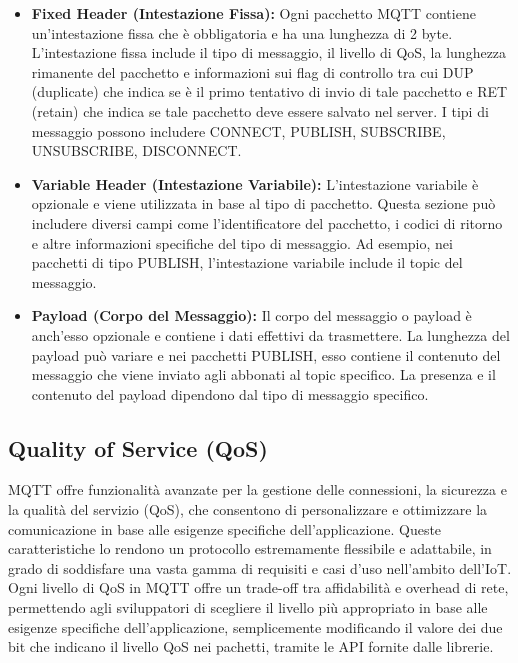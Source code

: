 \documentclass[12pt,a4paper,openright,twoside]{book}
\begin{document}
\begin{itemize}
\item \textbf{Fixed Header (Intestazione Fissa):} Ogni pacchetto MQTT contiene un'intestazione fissa che è obbligatoria e ha una lunghezza di 2 byte. 
L'intestazione fissa include il tipo di messaggio, il livello di \ac{QoS}, la lunghezza rimanente del pacchetto e informazioni sui flag di controllo
tra cui DUP (duplicate) che indica se è il primo tentativo di invio di tale pacchetto e RET (retain) che indica se tale pacchetto deve essere salvato nel server.
I tipi di messaggio possono includere CONNECT, PUBLISH, SUBSCRIBE, UNSUBSCRIBE, DISCONNECT.
\item \textbf{Variable Header (Intestazione Variabile):} L'intestazione variabile è opzionale e viene utilizzata in base al tipo di pacchetto. 
Questa sezione può includere diversi campi come l'identificatore del pacchetto, i codici di ritorno e altre informazioni specifiche del tipo di messaggio. 
Ad esempio, nei pacchetti di tipo PUBLISH, l'intestazione variabile include il topic del messaggio.
\item \textbf{Payload (Corpo del Messaggio):} Il corpo del messaggio o payload è anch'esso opzionale e contiene i dati effettivi da trasmettere. 
La lunghezza del payload può variare e nei pacchetti PUBLISH, esso contiene il contenuto del messaggio che viene inviato agli abbonati al topic specifico. 
La presenza e il contenuto del payload dipendono dal tipo di messaggio specifico.
\end{itemize}

\subsection{Quality of Service (QoS)}

\ac{MQTT} offre funzionalità avanzate per la gestione delle connessioni, la sicurezza e la qualità del servizio (\ac{QoS}), che consentono di personalizzare e ottimizzare 
la comunicazione in base alle esigenze specifiche dell'applicazione. Queste caratteristiche lo rendono un protocollo estremamente flessibile e adattabile, 
in grado di soddisfare una vasta gamma di requisiti e casi d'uso nell'ambito dell'\ac{IoT}. 
Ogni livello di \ac{QoS} in MQTT offre un trade-off tra affidabilità e overhead di rete, permettendo agli sviluppatori di scegliere il livello più appropriato in base alle esigenze 
specifiche dell'applicazione, semplicemente modificando il valore dei due bit che indicano il livello QoS nei pachetti, tramite le API fornite dalle librerie. 
\end{document}
